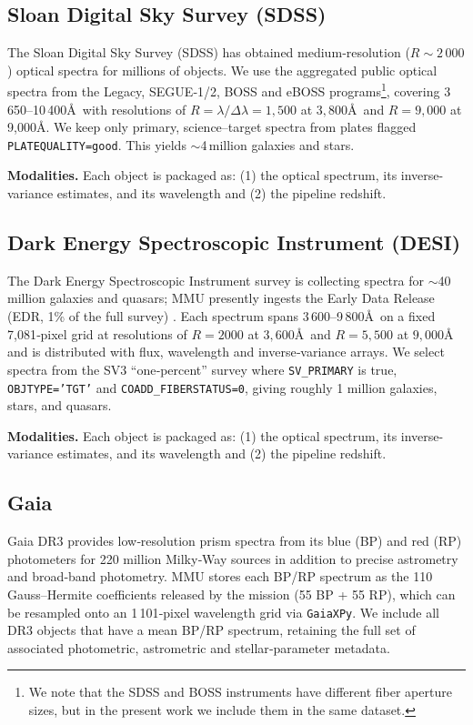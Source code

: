 \documentclass[]{polymathic}
\begin{document}
\subsection{Sloan Digital Sky Survey (SDSS)}
\label{sec:data:sdss}
The Sloan Digital Sky Survey (SDSS) \citep{ahumada202016th} has obtained medium‑resolution ($R\!\sim\!2\,000$) optical spectra for millions of objects. We use the aggregated public optical spectra from the Legacy, SEGUE‑1/2, BOSS and eBOSS programs\footnote{We note that the SDSS and BOSS instruments have different fiber aperture sizes, but in the present work we include them in the same dataset.}, covering 3\,650–10\,400\AA\, with resolutions of $R = \lambda /\Delta \lambda = 1,500$ at $3,800$\AA\ and $R=9,000$ at 9,000\AA. We keep only primary, science–target spectra from plates flagged \texttt{PLATEQUALITY=\textquotesingle good\textquotesingle}. This yields $\sim$4\,million galaxies and stars.

\textbf{Modalities.}  Each object is packaged as: (1) the optical spectrum, its inverse-variance estimates, and its wavelength and (2) the pipeline redshift.


\subsection{Dark Energy Spectroscopic Instrument (DESI)}
\label{sec:data:desi}
The Dark Energy Spectroscopic Instrument \citep{desi_survey} survey is collecting spectra for $\sim$40 million galaxies and quasars; MMU presently ingests the Early Data Release (EDR, 1\% of the full survey) \citep{desi_edr}.  Each spectrum spans 3\,600–9\,800\AA\ on a fixed 7,081‑pixel grid at resolutions of $R=2000$ at $3,600$\AA\ and $R=5,500$ at $9,000$\AA\, and is distributed with flux, wavelength and inverse‑variance arrays.  We select spectra from the SV3 ``one‑percent'' survey where \texttt{SV\_PRIMARY} is true, \texttt{OBJTYPE='TGT'} and \texttt{COADD\_FIBERSTATUS=0}, giving roughly 1 million galaxies, stars, and quasars.

\textbf{Modalities.}  Each object is packaged as: (1) the optical spectrum, its inverse-variance estimates, and its wavelength and (2) the pipeline redshift.

\subsection{Gaia}
\label{sec:data:gaia}
Gaia DR3 \citep{gaia2016gaia} provides low‑resolution prism spectra from its blue (BP) and red (RP) photometers for 220 million Milky‑Way sources in addition to precise astrometry and broad‑band photometry. MMU stores each BP/RP spectrum as the 110 Gauss–Hermite coefficients released by the mission (55 BP + 55 RP), which can be resampled onto an 1\,101‑pixel wavelength grid via \texttt{GaiaXPy}.  We include all DR3 objects that have a mean BP/RP spectrum, retaining the full set of associated photometric, astrometric and stellar‑parameter metadata. 
\end{document}
